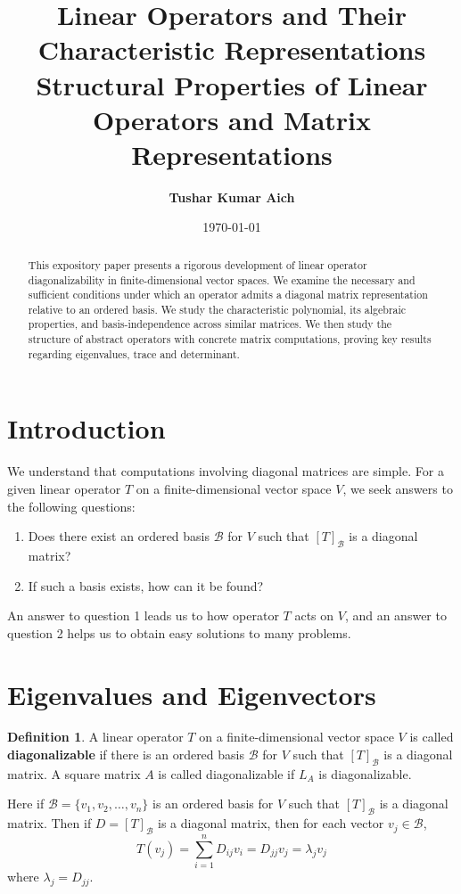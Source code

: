 \documentclass[12pt, a4paper]{article}
\title{\textbf{\Large  Linear Operators and Their Characteristic Representations \\ \large Structural Properties of Linear Operators and Matrix Representations }}
\author{\textbf{Tushar Kumar Aich}}
\date{\today}
\theoremstyle{definition}
\newtheorem{definition}{Definition}[section]
\theoremstyle{remark}
\newcommand{\B}{\mathscr{B}}
\begin{document}
\maketitle

\begin{abstract}
    This expository paper presents a rigorous development of linear operator diagonalizability in finite-dimensional vector spaces. We examine the necessary and sufficient conditions under which an operator admits a diagonal matrix representation relative to an ordered basis. We study the characteristic polynomial, its algebraic properties, and basis-independence across similar matrices. We then study the structure of abstract operators with concrete matrix computations, proving key results regarding eigenvalues, trace and determinant.
\end{abstract}

\section{Introduction}
We understand that computations involving diagonal matrices are simple. For a given linear operator $T$ on a finite-dimensional vector space $V$, we seek answers to the following questions:
\begin{enumerate}
    \item Does there exist an ordered basis $\B$ for $V$ such that $[T]_\B$ is a diagonal matrix?
    \item If such a basis exists, how can it be found?
\end{enumerate}

An answer to question 1 leads us to how operator $T$ acts on $V$, and an answer to question 2 helps us to obtain easy solutions to many problems. 
\section{Eigenvalues and Eigenvectors}
\begin{definition}
A linear operator $T$ on a finite-dimensional vector space $V$ is called \textbf{diagonalizable} if there is an ordered basis $\B$ for $V$ such that $[T]_\B$ is a diagonal matrix. A square matrix $A$ is called diagonalizable if $L_A$ is diagonalizable.
\end{definition}

Here if $\B = \{v_1, v_2, \dots, v_n\}$ is an ordered basis for $V$ such that $[T]_\B$ is a diagonal matrix. Then if $D = [T]_\B$ is a diagonal matrix, then for each vector $v_j \in \B$,
\[
T(v_j) = \sum_{i=1}^{n} D_{ij} v_i = D_{jj} v_j = \lambda_j v_j
\]
where $\lambda_j = D_{jj}$.
\end{document}
